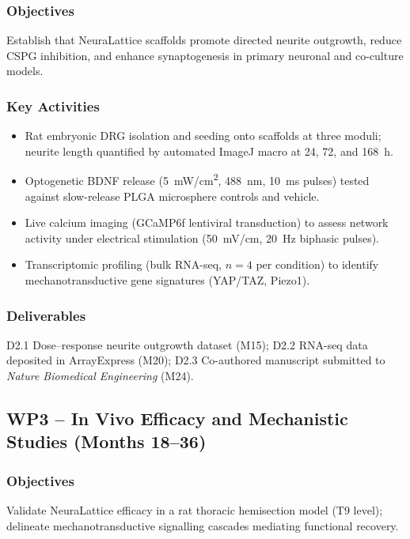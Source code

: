 \subsubsection{Objectives}
Establish that NeuraLattice scaffolds promote directed neurite outgrowth, reduce CSPG
inhibition, and enhance synaptogenesis in primary neuronal and co-culture models.

\subsubsection{Key Activities}
\begin{itemize}
  \item Rat embryonic DRG isolation and seeding onto scaffolds at three moduli;
    neurite length quantified by automated ImageJ macro at 24, 72, and 168~h.
  \item Optogenetic BDNF release (5~mW/cm\textsuperscript{2}, 488~nm, 10~ms pulses)
    tested against slow-release PLGA microsphere controls and vehicle.
  \item Live calcium imaging (GCaMP6f lentiviral transduction) to assess network
    activity under electrical stimulation (50~mV/cm, 20~Hz biphasic pulses).
  \item Transcriptomic profiling (bulk RNA-seq, $n = 4$ per condition) to identify
    mechanotransductive gene signatures (YAP/TAZ, Piezo1).
\end{itemize}

\subsubsection{Deliverables}
D2.1 Dose--response neurite outgrowth dataset (M15); D2.2 RNA-seq data deposited in
ArrayExpress (M20); D2.3 Co-authored manuscript submitted to \textit{Nature Biomedical
Engineering} (M24).

\subsection{WP3 -- In Vivo Efficacy and Mechanistic Studies (Months 18--36)}

\subsubsection{Objectives}
Validate NeuraLattice efficacy in a rat thoracic hemisection model (T9 level);
delineate mechanotransductive signalling cascades mediating functional recovery.

